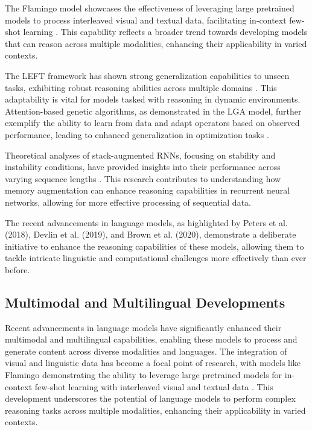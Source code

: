 The Flamingo model showcases the effectiveness of leveraging large pretrained models to process interleaved visual and textual data, facilitating in-context few-shot learning \cite{alayrac2022flamingo}. This capability reflects a broader trend towards developing models that can reason across multiple modalities, enhancing their applicability in varied contexts.



The LEFT framework has shown strong generalization capabilities to unseen tasks, exhibiting robust reasoning abilities across multiple domains \cite{hsu2023whatsleftconceptgrounding}. This adaptability is vital for models tasked with reasoning in dynamic environments. Attention-based genetic algorithms, as demonstrated in the LGA model, further exemplify the ability to learn from data and adapt operators based on observed performance, leading to enhanced generalization in optimization tasks \cite{lange2023discoveringattentionbasedgeneticalgorithms}.



Theoretical analyses of stack-augmented RNNs, focusing on stability and instability conditions, have provided insights into their performance across varying sequence lengths \cite{das2024exploringlearnabilitymemoryaugmentedrecurrent}. This research contributes to understanding how memory augmentation can enhance reasoning capabilities in recurrent neural networks, allowing for more effective processing of sequential data.



The recent advancements in language models, as highlighted by Peters et al. (2018), Devlin et al. (2019), and Brown et al. (2020), demonstrate a deliberate initiative to enhance the reasoning capabilities of these models, allowing them to tackle intricate linguistic and computational challenges more effectively than ever before. \cite{wei2022chain}



\subsection{Multimodal and Multilingual Developments} \label{subsec:Multimodal and Multilingual Developments}

Recent advancements in language models have significantly enhanced their multimodal and multilingual capabilities, enabling these models to process and generate content across diverse modalities and languages. The integration of visual and linguistic data has become a focal point of research, with models like Flamingo demonstrating the ability to leverage large pretrained models for in-context few-shot learning with interleaved visual and textual data \cite{alayrac2022flamingo}. This development underscores the potential of language models to perform complex reasoning tasks across multiple modalities, enhancing their applicability in varied contexts.



